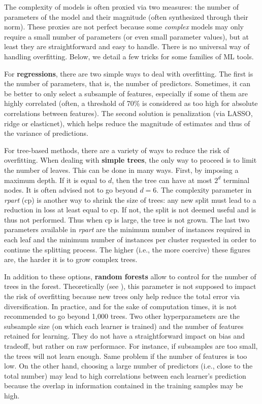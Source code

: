 The complexity of models is often proxied via two measures: the number of parameters of the model and their magnitude (often synthesized through their norm). These proxies are not perfect because some \textit{complex} models may only require a small number of parameters (or even small parameter values), but at least they are straightforward and easy to handle. There is no universal way of handling overfitting. Below, we detail a few tricks for some families of ML tools.

For \textbf{regressions}, there are two simple ways to deal with overfitting. The first is the number of parameters, that is, the number of predictors. Sometimes, it can be better to only select a subsample of features, especially if some of them are highly correlated (often, a threshold of 70\% is considered as too high for absolute correlations between features). The second solution is penalization (via LASSO, ridge or elasticnet), which helps reduce the magnitude of estimates and thus of the variance of predictions.

For tree-based methods, there are a variety of ways to reduce the risk of overfitting. When dealing with \textbf{simple trees}, the only way to proceed is to limit the number of leaves. This can be done in many ways. First, by imposing a maximum depth. If it is equal to $d$, then the tree can have at most $2^d$ terminal nodes. It is often advised not to go beyond $d=6$. The complexity parameter in \textit{rpart} (cp) is another way to shrink the size of trees: any new split must lead to a reduction in loss at least equal to cp. If not, the split is not deemed useful and is thus not performed. Thus when cp is large, the tree is not grown. The last two parameters available in \textit{rpart} are the minimum number of instances required in each leaf and the minimum number of instances per cluster requested in order to continue the splitting process. The higher (i.e., the more coercive) these figures are, the harder it is to grow complex trees.

In addition to these options, \textbf{random forests} allow to control for the number of trees in the forest. Theoretically (see \cite{breiman2001random}), this parameter is not supposed to impact the risk of overfitting because new trees only help reduce the total error via diversification. In practice, and for the sake of computation times, it is not recommended to go beyond 1,000 trees. Two other hyperparameters are the subsample size (on which each learner is trained) and the number of features retained for learning. They do not have a straightforward impact on bias and tradeoff, but rather on raw performace. For instance, if subsamples are too small, the trees will not learn enough. Same problem if the number of features is too low. On the other hand, choosing a large number of predictors (i.e., close to the total number) may lead to high correlations between each learner's prediction because the overlap in information contained in the training samples may be high.

